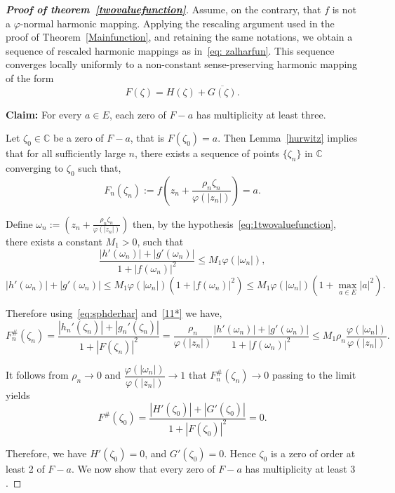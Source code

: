 \documentclass[11pt, reqno]{amsart}
\numberwithin{equation}{section}
\theoremstyle{definition}
\theoremstyle{remark}
\theoremstyle{plain}
\begin{document}
\begin{proof}[\bf{Proof of theorem~\ref{twovaluefunction}}]
Assume, on the contrary, that $f$ is not a
  $\varphi$-normal harmonic mapping. Applying the rescaling
argument used in the proof of Theorem~\ref{Mainfunction}, 
and retaining the same notations, we obtain
  a sequence of rescaled harmonic mappings as in~\eqref{eq: zalharfun}.
This sequence converges locally uniformly to a non-constant sense-preserving 
harmonic mapping of the form
  \[
  F(\zeta)=H(\zeta)+\overline{G(\zeta)}.
  \]

\noindent \textbf{Claim:} For every $a\in E$, each
 zero of $F-a$ has multiplicity at least three.
\smallskip

Let $\zeta_0 \in \mathbb{C}$ be a zero 
of $F-a$, that is $F(\zeta_0)=a$.
Then Lemma~\ref{hurwitz} implies that for all sufficiently large 
$n$, there exists a sequence of points $\{\zeta_n\}$
 in $\mathbb{C}$ converging to $\zeta_0$ such that,
\[
F_n(\zeta_n):=f\!\left(z_n+\frac{\rho_n\zeta_n}
{\varphi(|z_n|)}\right)=a.
\]

Define $\omega_n:=\!\left(z_n+\frac{\rho_n\zeta_n}
{\varphi(|z_n|)}\right)$
then, by the hypothesis~\eqref{eq:1twovaluefunction},
 there exists a constant 
$M_1>0$, such that
\begin{equation}\label{11*}
  \frac{|h'(\omega_n)|+|g'(\omega_n)|}
{1+|f(\omega_n)|^2}\leq M_1\varphi(|\omega_n|),
\end{equation}
\begin{equation}\label{*1*}
{|h'(\omega_n)|+|g'(\omega_n)|}
\leq M_1\varphi(|\omega_n|)({1+|f(\omega_n)|^2})
\leq M_1\varphi(|\omega_n|)({1+\max_{a\in E}|a|^2}).
\end{equation}

Therefore using~\eqref{eq:sphderhar} and~\eqref{11*} we have,
\[
F_n^\#(\zeta_n)=\frac{|h_n'(\zeta_n)|+|g_n'(\zeta_n)|}
{1+|F(\zeta_n)|^2}=\frac{\rho_n}{\varphi(|z_n|)}
\frac{|h'(\omega_n)|+|g'(\omega_n)|}{1+|f(\omega_n)|^2
}\leq M_1\rho_n \frac{\varphi(|\omega_n|)}{\varphi(|z_n|)}.
\]

It follows from $\rho_n \to 0$ and 
$\dfrac{\varphi(|\omega_n|)}{\varphi(|z_n|)} \longrightarrow 1$
that $F_n^{\#}(\zeta_n)\rightarrow 0 $ passing to the limit yields
\begin{equation}\label{eq: H'andG'=0}
  F^{\#}(\zeta_0)=\frac{|H'(\zeta_0)|+|G'(\zeta_0)|}{1+|F(\zeta_0)|^2}=0.
\end{equation}

Therefore, we have $H'(\zeta_0)=0$, and $G'(\zeta_0)=0$. 
Hence $\zeta_0$ is a zero of order at least
 2 of $F-a$. We now show that every zero of $F-a$ 
 has multiplicity at least $3$.
\smallskip


\end{proof}
\end{document}
